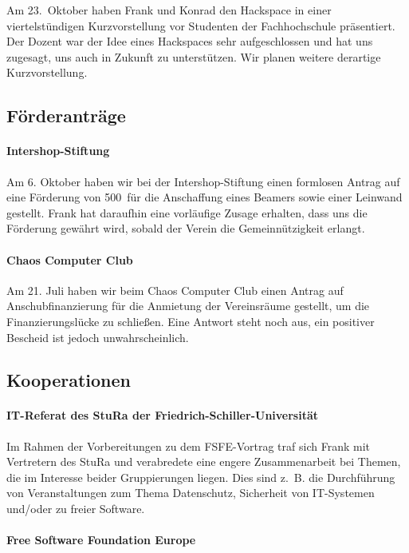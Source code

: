 \documentclass[10pt,DIV16]{scrartcl}
\begin{document}
Am 23.~Oktober haben Frank und Konrad den Hackspace in einer viertelstündigen
Kurzvorstellung vor Studenten der Fachhochschule präsentiert.  Der Dozent war
der Idee eines Hackspaces sehr aufgeschlossen und hat uns zugesagt, uns auch
in Zukunft zu unterstützen.  Wir planen weitere derartige Kurzvorstellung.

\subsection{Förderanträge}

\paragraph{Intershop-Stiftung}

Am 6. Oktober haben wir bei der Intershop-Stiftung einen formlosen
Antrag auf eine Förderung von 500\EUR\ für die Anschaffung eines
Beamers sowie einer Leinwand gestellt.  Frank hat daraufhin eine
vorläufige Zusage erhalten, dass uns die Förderung gewährt wird,
sobald der Verein die Gemeinnützigkeit erlangt.

\paragraph{Chaos Computer Club}

Am 21. Juli haben wir beim Chaos Computer Club einen Antrag auf
Anschubfinanzierung für die Anmietung der Vereinsräume gestellt, um die
Finanzierungslücke zu schließen. Eine Antwort steht noch aus, ein positiver
Bescheid ist jedoch unwahrscheinlich.


\subsection{Kooperationen}

\paragraph{IT-Referat des StuRa der Friedrich-Schiller-Universität}

Im Rahmen der Vorbereitungen zu dem FSFE-Vortrag traf sich Frank mit
Vertretern des StuRa und verabredete eine engere Zusammenarbeit bei
Themen, die im Interesse beider Gruppierungen liegen. Dies sind z.\,
B. die Durchführung von Veranstaltungen zum Thema Datenschutz,
Sicherheit von IT-Systemen und/oder zu freier Software.

\paragraph{Free Software Foundation Europe}
\end{document}
